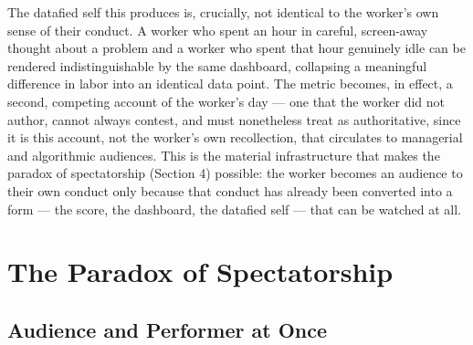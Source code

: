 \documentclass[10pt]{article}
\begin{document}
The datafied self this produces is, crucially, not identical to the worker's own sense of their conduct. A worker who spent an hour in careful, screen-away thought about a problem and a worker who spent that hour genuinely idle can be rendered indistinguishable by the same dashboard, collapsing a meaningful difference in labor into an identical data point. The metric becomes, in effect, a second, competing account of the worker's day --- one that the worker did not author, cannot always contest, and must nonetheless treat as authoritative, since it is this account, not the worker's own recollection, that circulates to managerial and algorithmic audiences. This is the material infrastructure that makes the paradox of spectatorship (Section 4) possible: the worker becomes an audience to their own conduct only because that conduct has already been converted into a form --- the score, the dashboard, the datafied self --- that can be watched at all.

\section{The Paradox of Spectatorship}

\subsection{Audience and Performer at Once}
\end{document}
